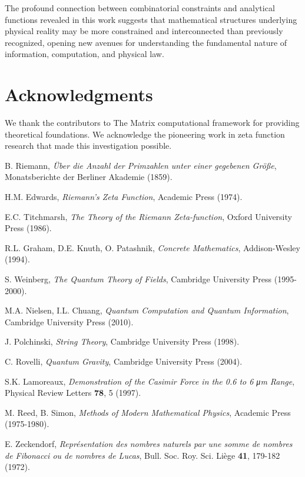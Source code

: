 \documentclass[12pt]{article}
\begin{document}
The profound connection between combinatorial constraints and analytical functions revealed in this work suggests that mathematical structures underlying physical reality may be more constrained and interconnected than previously recognized, opening new avenues for understanding the fundamental nature of information, computation, and physical law.

\section*{Acknowledgments}

We thank the contributors to The Matrix computational framework for providing theoretical foundations. We acknowledge the pioneering work in zeta function research that made this investigation possible.

\begin{thebibliography}{99}

 B. Riemann, \emph{Über die Anzahl der Primzahlen unter einer gegebenen Größe}, Monatsberichte der Berliner Akademie (1859).

 H.M. Edwards, \emph{Riemann's Zeta Function}, Academic Press (1974).

 E.C. Titchmarsh, \emph{The Theory of the Riemann Zeta-function}, Oxford University Press (1986).

 R.L. Graham, D.E. Knuth, O. Patashnik, \emph{Concrete Mathematics}, Addison-Wesley (1994).

 S. Weinberg, \emph{The Quantum Theory of Fields}, Cambridge University Press (1995-2000).

 M.A. Nielsen, I.L. Chuang, \emph{Quantum Computation and Quantum Information}, Cambridge University Press (2010).

 J. Polchinski, \emph{String Theory}, Cambridge University Press (1998).

 C. Rovelli, \emph{Quantum Gravity}, Cambridge University Press (2004).

 S.K. Lamoreaux, \emph{Demonstration of the Casimir Force in the 0.6 to 6 μm Range}, Physical Review Letters \textbf{78}, 5 (1997).

 M. Reed, B. Simon, \emph{Methods of Modern Mathematical Physics}, Academic Press (1975-1980).

 E. Zeckendorf, \emph{Représentation des nombres naturels par une somme de nombres de Fibonacci ou de nombres de Lucas}, Bull. Soc. Roy. Sci. Liège \textbf{41}, 179-182 (1972).


\end{thebibliography}
\end{document}
